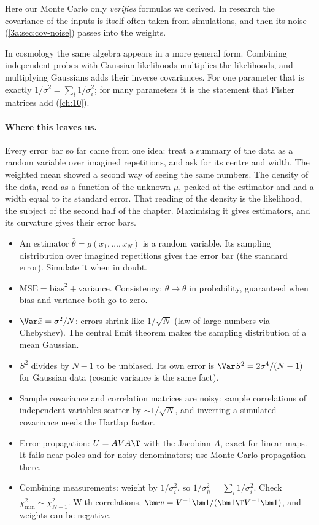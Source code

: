 Here our Monte Carlo only \emph{verifies} formulas we derived. In research
the covariance of the inputs is itself often taken from simulations, and
then its noise (\cref{3a:sec:cov-noise}) passes into the weights.

In cosmology the same algebra appears in a more general form. Combining
independent probes with Gaussian likelihoods multiplies the likelihoods,
and multiplying Gaussians adds their inverse covariances. For one parameter that is
exactly $1/\sigma^2=\sum_i1/\sigma_i^2$; for many parameters it is the
statement that Fisher matrices add (\cref{ch:10}).

\paragraph{Where this leaves us.}
Every error bar so far came from one idea: treat a summary of the data as a
random variable over imagined repetitions, and ask for its centre and width.
The weighted mean showed a second way of seeing the same numbers. The
density of the data, read as a function of the unknown $\mu$, peaked at the
estimator and had a width equal to its standard error. That reading of the
density is the likelihood, the subject of the second half of the chapter.
Maximising it gives estimators, and its curvature gives their error bars.

\begin{recap}
\begin{itemize}
  \item An estimator $\hat\theta=g(x_1,\dots,x_N)$ is a random variable. Its
        sampling distribution over imagined repetitions gives the error bar
        (the standard error). Simulate it when in doubt.
  \item $\mathrm{MSE}=\mathrm{bias}^2+\mathrm{variance}$. Consistency:
        $\hat\theta\to\theta$ in probability, guaranteed when bias and
        variance both go to zero.
  \item $\Var\bar x=\sigma^2/N$: errors shrink like $1/\sqrt N$ (law of
        large numbers via Chebyshev). The central limit theorem makes the
        sampling distribution of a mean Gaussian.
  \item $S^2$ divides by $N-1$ to be unbiased. Its own error is
        $\Var S^2=2\sigma^4/(N-1)$ for Gaussian data (cosmic variance is the
        same fact).
  \item Sample covariance and correlation matrices are noisy: sample
        correlations of independent variables scatter by $\sim1/\sqrt N$,
        and inverting a simulated covariance needs the Hartlap factor.
  \item Error propagation: $U=AVA\T$ with the Jacobian $A$, exact for linear
        maps. It fails near poles and for noisy denominators; use Monte Carlo
        propagation there.
  \item Combining measurements: weight by $1/\sigma_i^2$, so
        $1/\sigma_{\hat\mu}^2=\sum_i1/\sigma_i^2$. Check
        $\chi^2_{\min}\sim\chi^2_{N-1}$. With correlations,
        $\bm w=V^{-1}\bm1/(\bm1\T V^{-1}\bm1)$, and weights can be negative.
\end{itemize}
\end{recap}

